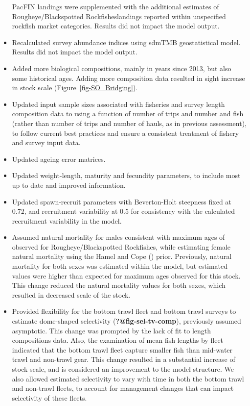 \documentclass[
]{scrartcl}
\begin{document}
\begin{itemize}
  PacFIN landings were supplemented with the additional estimates of
  Rougheye/Blackspotted Rockfisheslandings reported within unspecified
  rockfish market categories. Results did not impact the model output.
\item
  Recalculated survey abundance indices using sdmTMB geostatistical
  model. Results did not impact the model output.
\item
  Added more biological compositions, mainly in years since 2013, but
  also some historical ages. Adding more composition data resulted in
  sight increase in stock scale (Figure~\ref{fig-SO_Bridging}).
\item
  Updated input sample sizes associated with fisheries and survey length
  composition data to using a function of number of trips and number and
  fish (rather than number of trips and number of hauls, as in previous
  assessment), to follow current best practices and ensure a consistent
  treatment of fishery and survey input data.
\item
  Updated ageing error matrices.
\item
  Updated weight-length, maturity and fecundity parameters, to include
  most up to date and improved information.
\item
  Updated spawn-recruit parameters with Beverton-Holt steepness fixed at
  0.72, and recruitment variability at 0.5 for consistency with the
  calculated recruitment variability in the model.
\item
  Assumed natural mortality for males consistent with maximum ages of
  observed for Rougheye/Blackspotted Rockfishes, while estimating female
  natural mortality using the Hamel and Cope
  () prior. Previously,
  natural mortality for both sexes was estimated within the model, but
  estimated values were higher than expected for maximum ages observed
  for this stock. This change reduced the natural mortality values for
  both sexes, which resulted in decreased scale of the stock.
\item
  Provided flexibility for the bottom trawl fleet and bottom trawl
  surveys to estimate dome-shaped selectivity
  (\textbf{?@fig-sel-tv-comp}), previously assumed asymptotic. This
  change was prompted by the lack of fit to length compositions data.
  Also, the examination of mean fish lengths by fleet indicated that the
  bottom trawl fleet capture smaller fish than mid-water trawl and
  non-trawl gear. This change resulted in a substantial increase of
  stock scale, and is considered an improvement to the model structure.
  We also allowed estimated selectivity to vary with time in both the
  bottom trawl and non-trawl fleets, to account for management changes
  that can impact selectivity of these fleets.
\end{itemize}
\end{document}
